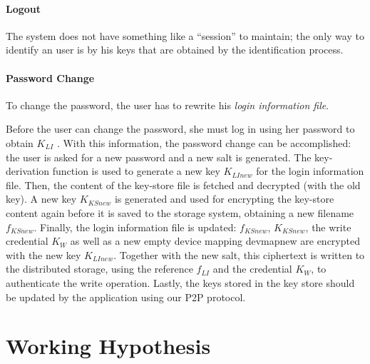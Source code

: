 \documentclass[12pt,spanish]{article}
\begin{document}
\paragraph{Logout}
The system does not have something like a ``session'' to maintain; the only way
to identify an user is by his keys that are obtained by the identification
process.


\paragraph{Password Change}
To change the password, the user has to rewrite his \textit{login information
file}.

Before the user can change the password, she must log in using her password to
obtain $K_{LI}$ . With this information, the password change can be accomplished:
the user is asked for a new password and a new salt is
generated. The key-derivation function is used to generate a new key
$K_{LInew}$
for the login information file. Then, the content of the key-store file is
fetched and decrypted (with the old key). A new key $K_{KSnew}$ is generated and
used for encrypting the key-store content again before it is saved to the
storage system, obtaining a new filename $f_{KSnew}$.
Finally, the login information file
is updated: $f_{KSnew}$, $K_{KSnew}$, the write credential $K_W$ as well as a new empty
device mapping devmapnew are encrypted with the new key $K_{LInew}$.
  Together with the new salt, this ciphertext is written to the distributed
storage, using the reference $f_{LI}$ and the credential $K_W$, to authenticate the
write operation. Lastly, the keys stored in the key store should be updated by
the application using our P2P protocol.




\vfill

\section{Working Hypothesis}
\end{document}
